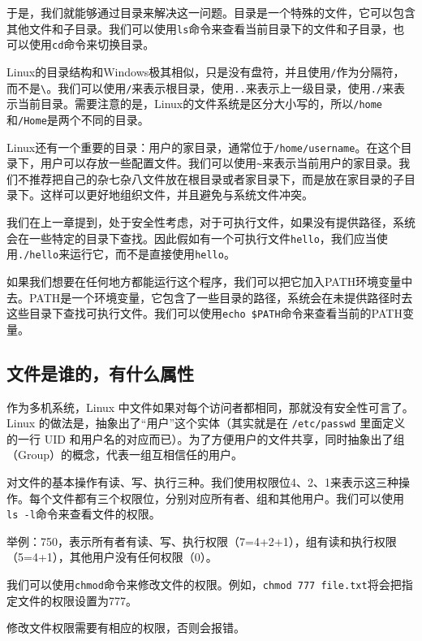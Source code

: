 \documentclass[../main.tex]{subfiles}
\begin{document}
于是，我们就能够通过目录来解决这一问题。目录是一个特殊的文件，它可以包含其他文件和子目录。我们可以使用\texttt{ls}命令来查看当前目录下的文件和子目录，也可以使用\texttt{cd}命令来切换目录。

Linux的目录结构和Windows极其相似，只是没有盘符，并且使用\texttt{/}作为分隔符，而不是\texttt{\textbackslash}。我们可以使用\texttt{/}来表示根目录，使用\texttt{..}来表示上一级目录，使用\texttt{./}来表示当前目录。需要注意的是，Linux的文件系统是区分大小写的，所以\texttt{/home}和\texttt{/Home}是两个不同的目录。

Linux还有一个重要的目录：用户的家目录，通常位于\texttt{/home/username}。在这个目录下，用户可以存放一些配置文件。我们可以使用\texttt{\textasciitilde}来表示当前用户的家目录。我们不推荐把自己的杂七杂八文件放在根目录或者家目录下，而是放在家目录的子目录下。这样可以更好地组织文件，并且避免与系统文件冲突。

我们在上一章提到，处于安全性考虑，对于可执行文件，如果没有提供路径，系统会在一些特定的目录下查找。因此假如有一个可执行文件\texttt{hello}，我们应当使用\texttt{./hello}来运行它，而不是直接使用\texttt{hello}。

如果我们想要在任何地方都能运行这个程序，我们可以把它加入PATH环境变量中去。PATH是一个环境变量，它包含了一些目录的路径，系统会在未提供路径时去这些目录下查找可执行文件。我们可以使用\texttt{echo \$PATH}命令来查看当前的PATH变量。

\subsection{文件是谁的，有什么属性}

作为多机系统，Linux 中文件如果对每个访问者都相同，那就没有安全性可言了。Linux 的做法是，抽象出了“用户”这个实体（其实就是在 \texttt{/etc/passwd} 里面定义的一行 UID 和用户名的对应而已）。为了方便用户的文件共享，同时抽象出了组（Group）的概念，代表一组互相信任的用户。

对文件的基本操作有读、写、执行三种。我们使用权限位4、2、1来表示这三种操作。每个文件都有三个权限位，分别对应所有者、组和其他用户。我们可以使用\texttt{ls -l}命令来查看文件的权限。

举例：750，表示所有者有读、写、执行权限（7=4+2+1），组有读和执行权限（5=4+1），其他用户没有任何权限（0）。

我们可以使用\texttt{chmod}命令来修改文件的权限。例如，\texttt{chmod 777 file.txt}将会把指定文件的权限设置为777。

\begin{tip}
  修改文件权限需要有相应的权限，否则会报错。
\end{tip}
\end{document}
